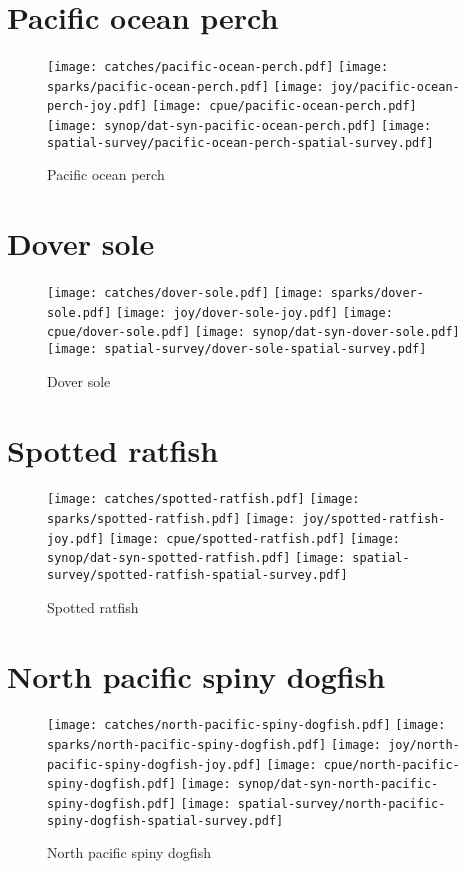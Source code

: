 \section*{Pacific ocean perch}

\begin{figure}[htbp]
\centering
\texttt{[image: catches/pacific-ocean-perch.pdf]}
\texttt{[image: sparks/pacific-ocean-perch.pdf]}
\texttt{[image: joy/pacific-ocean-perch-joy.pdf]}
\texttt{[image: cpue/pacific-ocean-perch.pdf]}
\texttt{[image: synop/dat-syn-pacific-ocean-perch.pdf]}
\texttt{[image: spatial-survey/pacific-ocean-perch-spatial-survey.pdf]}
\caption{Pacific ocean perch}
\end{figure}
\clearpage
\section*{Dover sole}

\begin{figure}[htbp]
\centering
\texttt{[image: catches/dover-sole.pdf]}
\texttt{[image: sparks/dover-sole.pdf]}
\texttt{[image: joy/dover-sole-joy.pdf]}
\texttt{[image: cpue/dover-sole.pdf]}
\texttt{[image: synop/dat-syn-dover-sole.pdf]}
\texttt{[image: spatial-survey/dover-sole-spatial-survey.pdf]}
\caption{Dover sole}
\end{figure}
\clearpage
\section*{Spotted ratfish}

\begin{figure}[htbp]
\centering
\texttt{[image: catches/spotted-ratfish.pdf]}
\texttt{[image: sparks/spotted-ratfish.pdf]}
\texttt{[image: joy/spotted-ratfish-joy.pdf]}
\texttt{[image: cpue/spotted-ratfish.pdf]}
\texttt{[image: synop/dat-syn-spotted-ratfish.pdf]}
\texttt{[image: spatial-survey/spotted-ratfish-spatial-survey.pdf]}
\caption{Spotted ratfish}
\end{figure}
\clearpage
\section*{North pacific spiny dogfish}

\begin{figure}[htbp]
\centering
\texttt{[image: catches/north-pacific-spiny-dogfish.pdf]}
\texttt{[image: sparks/north-pacific-spiny-dogfish.pdf]}
\texttt{[image: joy/north-pacific-spiny-dogfish-joy.pdf]}
\texttt{[image: cpue/north-pacific-spiny-dogfish.pdf]}
\texttt{[image: synop/dat-syn-north-pacific-spiny-dogfish.pdf]}
\texttt{[image: spatial-survey/north-pacific-spiny-dogfish-spatial-survey.pdf]}
\caption{North pacific spiny dogfish}
\end{figure}
\clearpage
